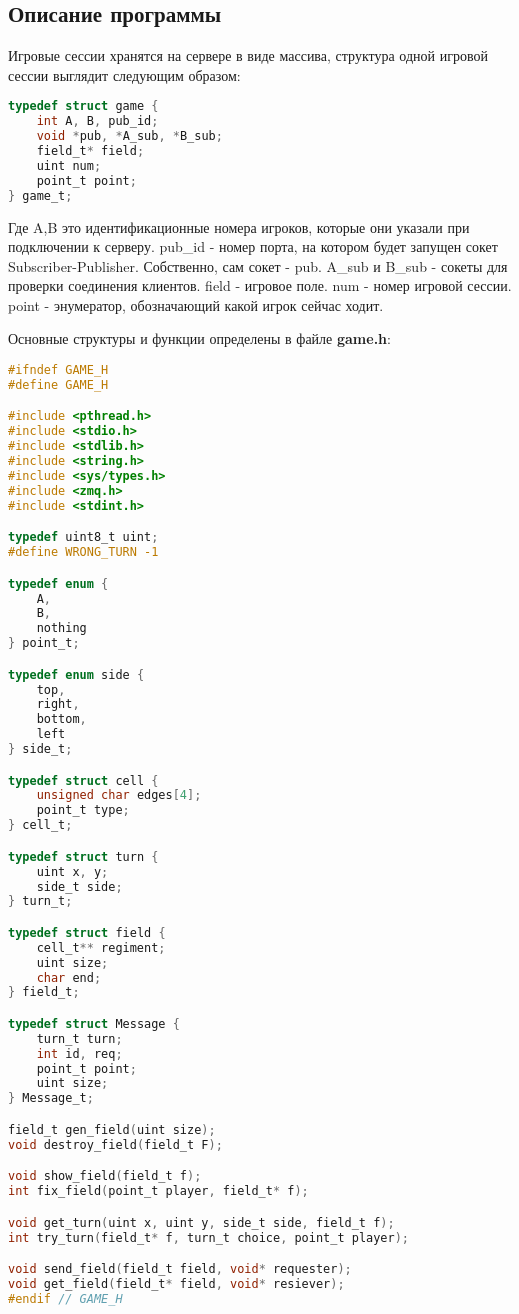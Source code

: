 \documentclass[12pt]{article}
\begin{document}
\subsection*{Описание программы}

Игровые сессии хранятся на сервере в виде массива, структура одной игровой сессии выглядит следующим образом:
{\footnotesize \begin{lstlisting}[language=C]
typedef struct game {
    int A, B, pub_id;
    void *pub, *A_sub, *B_sub;
    field_t* field;
    uint num;
    point_t point;
} game_t;
\end{lstlisting}}

Где A,B это идентификационные номера игроков, которые они указали при подключении к серверу. pub\_id - номер порта, на котором будет запущен сокет Subscriber-Publisher. Собственно, сам сокет - pub. A\_sub и B\_sub - сокеты для проверки соединения клиентов. field - игровое поле. num - номер игровой сессии. point - энумератор, обозначающий какой игрок сейчас ходит.
\newline


Основные структуры и функции определены в файле {\bf game.h}:
{\footnotesize \begin{lstlisting}[language=C]
#ifndef GAME_H
#define GAME_H

#include <pthread.h>
#include <stdio.h>
#include <stdlib.h>
#include <string.h>
#include <sys/types.h>
#include <zmq.h>
#include <stdint.h>

typedef uint8_t uint;
#define WRONG_TURN -1

typedef enum {
    A,
    B,
    nothing
} point_t;

typedef enum side {
    top,
    right,
    bottom,
    left
} side_t;

typedef struct cell {
    unsigned char edges[4];
    point_t type;
} cell_t;

typedef struct turn {
    uint x, y;
    side_t side;
} turn_t;

typedef struct field {
    cell_t** regiment;
    uint size;
    char end;
} field_t;

typedef struct Message {
    turn_t turn;
    int id, req;
    point_t point;
    uint size;
} Message_t;

field_t gen_field(uint size);
void destroy_field(field_t F);

void show_field(field_t f);
int fix_field(point_t player, field_t* f);

void get_turn(uint x, uint y, side_t side, field_t f);
int try_turn(field_t* f, turn_t choice, point_t player);

void send_field(field_t field, void* requester);
void get_field(field_t* field, void* resiever);
#endif // GAME_H
\end{lstlisting}}
\end{document}
